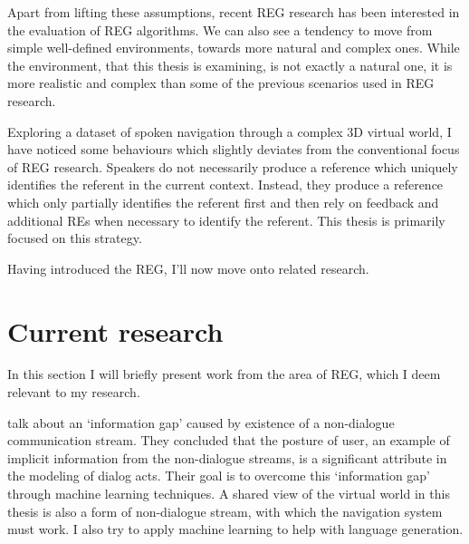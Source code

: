 Apart from lifting these assumptions, recent REG research has been interested in the evaluation of REG algorithms. We can also see a tendency to move from simple well-defined environments, towards more natural and complex ones. While the environment, that this thesis is examining, is not exactly a natural one, it is more realistic and complex than some of the previous scenarios used in REG research.

Exploring a dataset of spoken navigation through a complex 3D virtual world, I have noticed some behaviours which slightly deviates from the conventional focus of REG research. Speakers do not necessarily produce a reference which uniquely identifies the referent in the current context. Instead, they produce a reference which only partially identifies the referent first and then rely on feedback and additional REs when necessary to identify the referent. This thesis is primarily focused on this strategy.

Having introduced the REG, I'll now move onto related research.

\section{Current research}
\label{sec:relwork}
In this section I will briefly present work from the area of REG, which I deem relevant to my research.

\citet{ha2012combining} talk about an `information gap' caused by existence of a non-dialogue communication stream. They concluded that the posture of user, an example of implicit information from the non-dialogue streams, is a significant attribute in the modeling of dialog acts. Their goal is to overcome this `information gap' through machine learning techniques. A shared view of the virtual world in this thesis is also a form of non-dialogue stream, with which the navigation system must work. I also try to apply machine learning to help with language generation.

